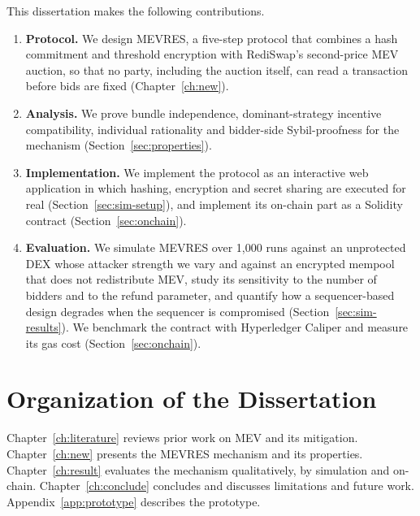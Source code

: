 This dissertation makes the following contributions.
\begin{enumerate}
    \item \textbf{Protocol.} We design MEVRES, a five-step protocol that combines a hash commitment and threshold encryption with RediSwap's second-price MEV auction, so that no party, including the auction itself, can read a transaction before bids are fixed (Chapter~\ref{ch:new}).
    \item \textbf{Analysis.} We prove bundle independence, dominant-strategy incentive compatibility, individual rationality and bidder-side Sybil-proofness for the mechanism (Section~\ref{sec:properties}).
    \item \textbf{Implementation.} We implement the protocol as an interactive web application in which hashing, encryption and secret sharing are executed for real (Section~\ref{sec:sim-setup}), and implement its on-chain part as a Solidity contract (Section~\ref{sec:onchain}).
    \item \textbf{Evaluation.} We simulate MEVRES over 1{,}000 runs against an unprotected DEX whose attacker strength we vary and against an encrypted mempool that does not redistribute MEV, study its sensitivity to the number of bidders and to the refund parameter, and quantify how a sequencer-based design degrades when the sequencer is compromised (Section~\ref{sec:sim-results}). We benchmark the contract with Hyperledger Caliper and measure its gas cost (Section~\ref{sec:onchain}).
\end{enumerate}

\section{Organization of the Dissertation}

Chapter~\ref{ch:literature} reviews prior work on MEV and its mitigation. Chapter~\ref{ch:new} presents the MEVRES mechanism and its properties. Chapter~\ref{ch:result} evaluates the mechanism qualitatively, by simulation and on-chain. Chapter~\ref{ch:conclude} concludes and discusses limitations and future work. Appendix~\ref{app:prototype} describes the prototype.
